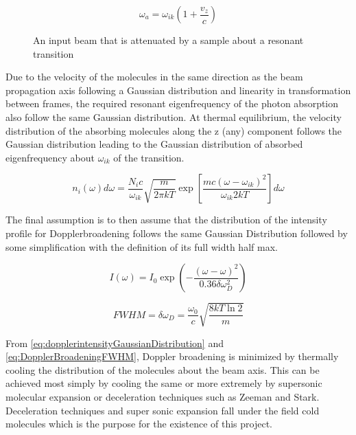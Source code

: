\documentclass[11pt,a4paper]{book}
\newcommand{\imginput}[1]{} %
\begin{document}
\begin{equation}
\label{eq:frequencyInNewRestFrame}
\omega_a =\omega_{ik} \left(1+\dfrac{v_z}{c} \right)
\end{equation}

\begin{figure} [!ht]
	\centering
	\def\svgwidth{\columnwidth}
	\resizebox{150mm}{!}{\imginput{images/dop-broad.pdf_tex}}
	\label{fig:dop-broad}
	\caption{An input beam that is attenuated by a sample about a resonant transition}
\end{figure}	

Due to the velocity of the molecules in the same direction as the beam propagation axis following a Gaussian distribution and linearity in transformation between frames, the required resonant eigenfrequency of the photon absorption also follow the same Gaussian distribution. 
At thermal equilibrium, the velocity distribution of the absorbing molecules along the z (any) component follows the Gaussian distribution
leading to the Gaussian distribution of absorbed eigenfrequency about $\omega_{ik}$ of the transition.

\begin{equation}
\label{eq:EigenFrequencyGaussianDistribution}
n_i(\omega)d\omega = \dfrac{N_i c}{\omega_{ik}} \sqrt{\dfrac{m}{2 \pi k T }} \exp{\left[\frac{m c (\omega-\omega_{ik})^2}{\omega_{ik} 2kT}\right]} d\omega
\end{equation}

The final assumption is to then assume that the distribution of the intensity profile for Dopplerbroadening follows the same Gaussian Distribution followed by some simplification with the definition of its full width half max.

\begin{equation}
\label{eq:dopplerintensityGaussianDistribution}
I(\omega)=I_0 \exp{\left(-\dfrac{(\omega-\omega)^2}{0.36 \delta \omega_{D}^2}\right)}
\end{equation}

\begin{equation}
\label{eq:DopplerBroadeningFWHM}
FWHM=\delta \omega_D =\dfrac{\omega_0}{c} \sqrt{\dfrac{8kT\ln{2}}{m}}
\end{equation}

From \autoref{eq:dopplerintensityGaussianDistribution} and \autoref{eq:DopplerBroadeningFWHM}, Doppler broadening is minimized by thermally cooling the distribution of the molecules about the beam axis. This can be achieved most simply by cooling the same or more extremely by supersonic molecular expansion or deceleration techniques such as Zeeman and Stark. Deceleration techniques and super sonic expansion fall under the field cold molecules which is the purpose for the existence of this project.
\end{document}
